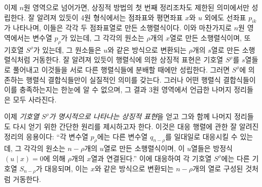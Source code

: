 
이제 $n$원 영역으로 넘어가면, 상징적 방법의 첫 번째 정리조차도 제한된 의미에서만 성립한다. 잘 알려져 있듯이 4원 형식에서는 점좌표와 평면좌표 $x$와 $u$ 외에도 선좌표 $p_{ik}$가 나타나며, 이들은 각각 두 점좌표열로 만든 소행렬식이다. 이와 마찬가지로 $n$원 영역에서는 변수열 $p_\rho$가 있는데, 그 각각의 원소는 $\rho$개의 $x$열로 만든 소행렬식이며, 또 기호열 $S^\rho$가 있는데, 그 원소들은 $u$와 같은 방식으로 변환되는 $\rho$개의 $s$열로 만든 소행렬식처럼 거동한다. 잘 알려져 있듯이 행렬식에 의한 상징적 표현은 기호열 $S^\rho$를 $s$열들로 풀어내고 이것들을 서로 다른 행렬식들에 분배할 때에만 성립한다. 그러면 $S^\rho$에 의존하는 행렬식 결합식들만이 실질적인 의미를 갖는다. 그러나 어떤 행렬식 결합식들이 이를 충족하는지는 한눈에 알 수 없으며, 그 결과 3원 영역에서 언급한 나머지 정리들은 모두 사라진다.

이제 \emph{기호열 $S^\rho$가 명시적으로 나타나는 상징적 표현}을 얻고 그와 함께 나머지 정리들도 다시 얻기 위한 간단한 원리를 제시하고자 한다. 이것은 대응 행렬에 관한 잘 알려진 정리의 응용이다: ``각 변수열 $p_\rho$에는 다른 변수열 $q_{n-\rho}$를 일대일로 대응시킬 수 있는데, 그 각각의 원소는 $n-\rho$개의 $u$열로 만든 소행렬식이며, 이 $u$열들은 방정식 $(u\mid x)=0$에 의해 $\rho$개의 $x$열과 연결된다.'' 이에 대응하여 각 기호열 $S^\rho$에는 다른 기호열 $S_{n-\rho}$가 대응되며, 이는 $x$와 같은 방식으로 변환되는 $n-\rho$개의 열로 구성된 것처럼 거동한다.

